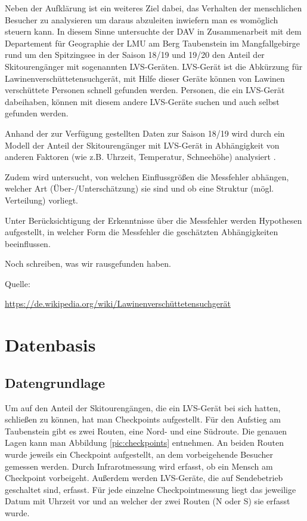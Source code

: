 \documentclass[12pt]{scrreprt}
\begin{document}
Neben der Aufklärung ist ein weiteres Ziel dabei, das Verhalten der menschlichen Besucher zu analysieren um daraus abzuleiten inwiefern man es womöglich steuern kann. In diesem Sinne untersuchte der DAV in Zusammenarbeit mit dem Departement für Geographie der LMU am Berg Taubenstein im Mangfallgebirge rund um den Spitzingsee in der Saison 18/19 und 19/20 den Anteil der Skitourengänger mit sogenannten LVS-Geräten. LVS-Gerät ist die Abkürzung für Lawinenverschüttetensuchgerät, mit Hilfe dieser Geräte können von Lawinen verschüttete Personen schnell gefunden werden. Personen, die ein LVS-Gerät dabeihaben, können mit diesem andere LVS-Geräte suchen und auch selbst gefunden werden.



Anhand der zur Verfügung gestellten Daten zur Saison 18/19 wird durch ein Modell der Anteil der Skitourengänger mit LVS-Gerät in Abhängigkeit von anderen Faktoren (wie z.B. Uhrzeit, Temperatur, Schneehöhe) analysiert .

Zudem wird untersucht, von welchen Einflussgrößen die Messfehler abhängen, welcher Art (Über-/Unterschätzung) sie sind und ob eine Struktur (mögl. Verteilung) vorliegt.

Unter Berücksichtigung der Erkenntnisse über die Messfehler werden Hypothesen aufgestellt, in welcher Form die Messfehler die geschätzten Abhängigkeiten beeinflussen.



Noch schreiben, was wir rausgefunden haben.



Quelle:

\url{https://de.wikipedia.org/wiki/Lawinenverschüttetensuchgerät}



\chapter{Datenbasis}

\section{Datengrundlage}

Um auf den Anteil der Skitourengängen, die ein LVS-Gerät bei sich hatten, schließen zu können, hat man Checkpoints aufgestellt. Für den Aufstieg am Taubenstein gibt es zwei Routen, eine Nord- und eine Südroute. Die genauen Lagen kann man Abbildung \ref{pic:checkpoints} entnehmen. An beiden Routen wurde jeweils ein Checkpoint aufgestellt, an dem vorbeigehende Besucher gemessen werden. Durch Infrarotmessung wird erfasst, ob ein Mensch am Checkpoint vorbeigeht. Außerdem werden LVS-Geräte, die auf Sendebetrieb geschaltet sind, erfasst. Für jede einzelne Checkpointmessung liegt das jeweilige Datum mit Uhrzeit vor und an welcher der zwei Routen (N oder S) sie erfasst wurde.
\end{document}

